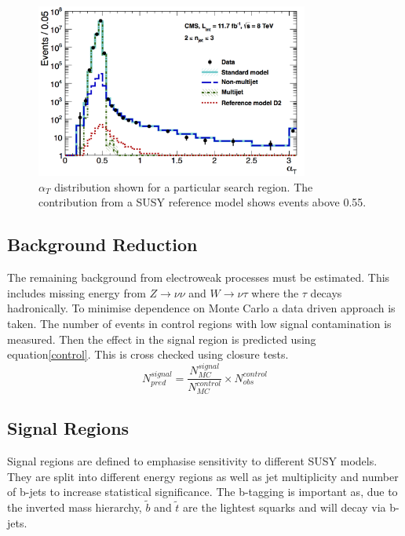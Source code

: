 \begin{figure}
\centering
    \includegraphics[width=0.8\textwidth]{Figures/sample_aT.jpg}
  \caption{$\alpha_T$ distribution shown for a particular search region. The contribution from a SUSY reference model shows events above 0.55.}
  \label{alphdis}
\end{figure}

\subsection{Background Reduction}
The remaining background from electroweak processes must be estimated. This includes missing energy from $Z\rightarrow\nu\nu$ and $W\rightarrow\nu\tau$ where the $\tau$ decays hadronically. To minimise dependence on Monte Carlo a data driven approach is taken. The number of events in control regions with low signal contamination is measured. Then the effect in the signal region is predicted using equation\ref{control}. This is cross checked using closure tests.
\begin{equation}
\label{control}
N_{pred}^{signal}=\frac{N_{MC}^{signal}}{N_{MC}^{control}}\times N^{control}_{obs}
\end{equation} 
\subsection{Signal Regions}
Signal regions are defined to emphasise sensitivity to different SUSY models\cite{CMSAT8}. They are split into different energy regions as well as jet multiplicity and number of b-jets to increase statistical significance. The b-tagging is important as, due to the inverted mass hierarchy, $\tilde{b}$ and $\tilde{t}$ are the lightest squarks and will decay via b-jets.
